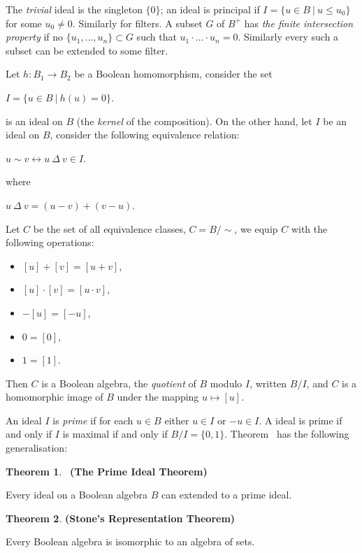 \documentclass[8pt]{article}
\theoremstyle{definition}
\theoremstyle{definition}
\newtheorem{theorem}{Theorem}[section]
\theoremstyle{definition}
\theoremstyle{definition}
\theoremstyle{definition}
\theoremstyle{definition}
\theoremstyle{definition}
\theoremstyle{definition}
\theoremstyle{definition}
\theoremstyle{definition}
\theoremstyle{definition}
\theoremstyle{definition}
\theoremstyle{definition}
\theoremstyle{definition}
\theoremstyle{question}
\begin{document}
The \emph{trivial} ideal is the singleton $\{ 0 \}$; an ideal is principal if $I = \{ u \in B \: | \: u \leq u_0 \}$ for
some $u_0 \neq 0$. Similarly for filters. A subset $G$ of $B^+$ has \emph{the finite intersection property} if no
$\{ u_1, \dots, u_n\} \subset G$ such that $u_1 \cdot \dots \cdot u_n = 0$. Similarly every such a subset
can be extended to some filter.

Let $h : B_1 \to B_2$ be a Boolean homomorphism, consider the set
\begin{center}
  $I = \{ u \in B \: | \: h(u) = 0 \}$.
\end{center}
is an ideal on $B$ (the \emph{kernel} of the composition). On the other hand, let $I$ be an ideal on $B$, consider the
following equivalence relation:
\begin{center}
  $u \sim v \leftrightarrow u \: \Delta \: v \in I$.
\end{center}
where
\begin{center}
  $u \: \Delta \: v = (u - v) + (v - u)$.
\end{center}

Let $C$ be the set of all equivalence classes, $C = B / \sim$, we equip $C$ with the following operations:
\begin{itemize}
  \item $[u] + [v] = [u + v]$,
  \item $[u] \cdot [v] = [u \cdot v]$,
  \item $-[u] = [- u]$,
  \item $0 = [0]$,
  \item $1 = [1]$.
\end{itemize}

Then $C$ is a Boolean algebra, the \emph{quotient} of $B$ modulo $I$, written $B/I$,
and $C$ is a homomorphic image of $B$ under the mapping $u \mapsto [u]$.

An ideal $I$ is \emph{prime} if for each $u \in B$ either $u \in I$ or $- u \in I$. A ideal is prime
if and only if $I$ is maximal if and only if $B/I = \{ 0, 1\}$.
Theorem~\label{existence} has the following generalisation:
\begin{theorem}~\label{prime:ideal} {\bf (The Prime Ideal Theorem)}

Every ideal on a Boolean algebra $B$ can extended to a prime ideal.
\end{theorem}

\begin{theorem} {\bf (Stone's Representation Theorem)}

Every Boolean algebra is isomorphic to an algebra of sets.
\end{theorem}
\end{document}
